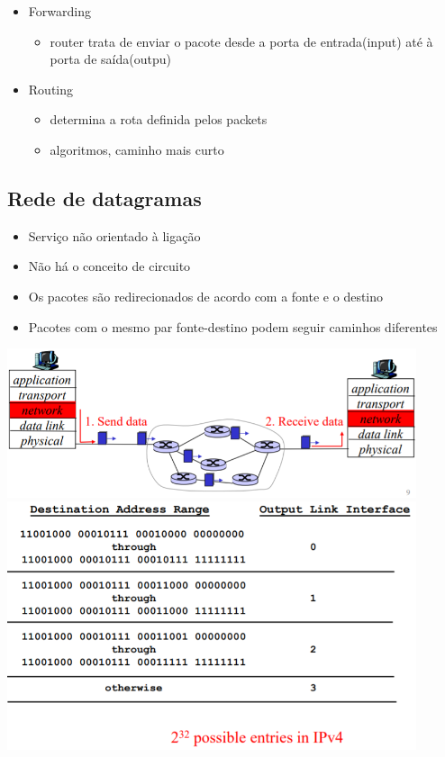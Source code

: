 \documentclass[../resumosRCOM.tex]{subfiles}
\begin{document}
\begin{itemize}
    \item Forwarding
    \begin{itemize}
        \item router trata de enviar o pacote desde a porta de entrada(input) até à porta de saída(outpu)
    \end{itemize}
    \item Routing
    \begin{itemize}
        \item determina a rota definida pelos packets
        \item algoritmos, caminho mais curto
    \end{itemize}
\end{itemize}

\subsection{Rede de datagramas}
\begin{itemize}
    \item Serviço não orientado à ligação
	\item Não há o conceito de circuito
	\item Os pacotes são redirecionados de acordo com a fonte e o destino
	\item Pacotes com o mesmo par fonte-destino podem seguir caminhos diferentes
\end{itemize}
\begin{center}            
    \includegraphics[width=12cm]{images/RCOM2.png}
    \includegraphics[width=12cm]{images/RCOM3.png}
\end{center}
\end{document}
